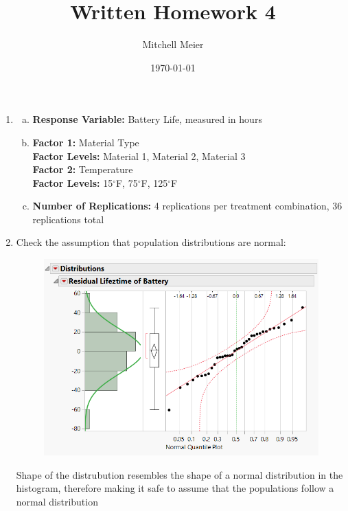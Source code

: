\documentclass[14pt]{article}
\title{Written Homework 4}
\author{Mitchell Meier}
\date{\today}
\newcommand{\bd}{\textbf}
\begin{document}
\maketitle

\begin{enumerate}

\item
\begin{enumerate}[(a)]
\item
\bd{Response Variable:} Battery Life, measured in hours

\item
\bd{Factor 1:} Material Type \\
\bd{Factor Levels:} Material 1, Material 2, Material 3 \\

\bd{Factor 2:} Temperature \\
\bd{Factor Levels:} 15$^{\circ}$F, 75$^{\circ}$F, 125$^{\circ}$F

\item
\bd{Number of Replications:} 4 replications per treatment combination, 36 replications total
\end{enumerate}
\vspace{2.5em}

\item
Check the assumption that population distributions are normal:
\begin{figure}[h]
\includegraphics[scale=0.75]{hw4Pics/2-1.PNG}
\centering
\end{figure}

Shape of the distrubution resembles the shape of a normal distribution in the histogram, therefore making it safe to assume that the populations follow a normal distribution \\


\end{enumerate}
\end{document}
